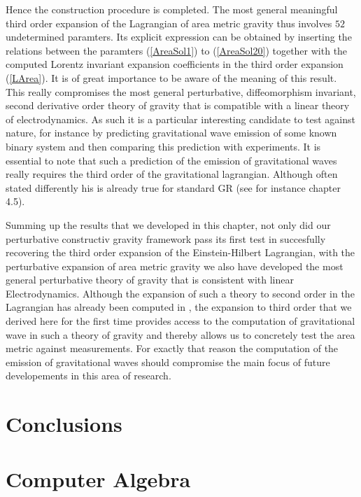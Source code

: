 \documentclass[a4paper,12pt, DIV=14, BCOR=5mm, twoside, headsepline]{scrbook}
\begin{document}
Hence the construction procedure is completed. The most general meaningful third order expansion of the Lagrangian of area metric gravity thus involves $52$ undetermined paramters. Its explicit expression can be obtained by inserting the relations between the paramters (\ref{AreaSol1}) to (\ref{AreaSol20}) together with the computed Lorentz invariant expansion coefficients in the third order expansion (\ref{LArea}). It is of great importance to be aware of the meaning of this result. This really compromises the most general perturbative, diffeomorphism invariant, second derivative order theory of gravity that is compatible with a linear theory of electrodynamics. As such it is a particular interesting candidate to test against nature, for instance by predicting gravitational wave emission of some known binary system and then comparing this prediction with experiments. It is essential to note that such a prediction of the emission of gravitational waves really requires the third order of the gravitational lagrangian. Although often stated differently his is already true for standard GR (see for instance \cite{1984grra.book.....S} chapter 4.5).

Summing up the results that we developed in this chapter, not only did our perturbative constructiv gravity framework pass its first test in succesfully recovering the third order expansion of the Einstein-Hilbert Lagrangian, with the perturbative expansion of area metric gravity we also have developed the most general perturbative theory of gravity that is consistent with linear Electrodynamics. Although the expansion of such a theory to second order in the Lagrangian has already been computed in \cite{2017arXiv170803870S}, the expansion to third order that we derived here for the first time provides access to the computation of gravitational wave in such a theory of gravity and thereby allows us to concretely test the area metric against measurements. For exactly that reason the computation of the emission of gravitational waves should compromise the main focus of future developements in this area of research. 

\chapter{Conclusions}

\appendix
\chapter{Computer Algebra}
\end{document}
